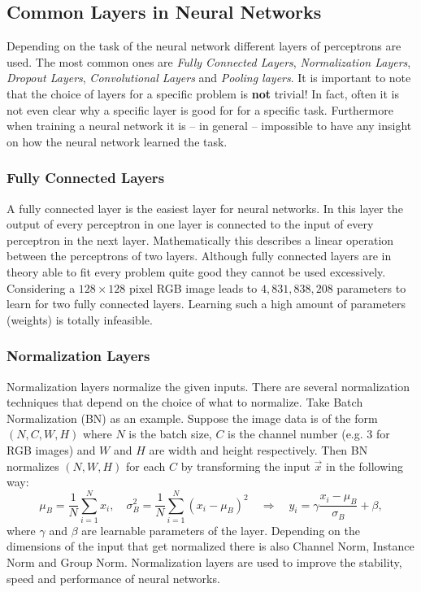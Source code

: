 \subsection{Common Layers in Neural Networks} \label{sec:2.1.3}
Depending on the task of the neural network different layers of perceptrons are used. The most common ones are \textit{Fully Connected Layers}, \textit{Normalization Layers}, \textit{Dropout Layers}, \textit{Convolutional Layers} and \textit{Pooling layers}. It is important to note that the choice of layers for a specific problem is \textbf{not} trivial! In fact, often it is not even clear why a specific layer is good for for a specific task. Furthermore when training a neural network it is – in general – impossible to have any insight on how the neural network learned the task.
%
\subsubsection{Fully Connected Layers}
A fully connected layer is the easiest layer for neural networks. In this layer the output of every perceptron in one layer is connected to the input of every perceptron in the next layer. Mathematically this describes a linear operation between the perceptrons of two layers. Although fully connected layers are in theory able to fit every problem quite good they cannot be used excessively. Considering a $128\times128$ pixel RGB image leads to $4,831,838,208$ parameters to learn for two fully connected layers. Learning such a high amount of parameters (weights) is totally infeasible.
%
\subsubsection{Normalization Layers}
Normalization layers normalize the given inputs. There are several normalization techniques that depend on the choice of what to normalize. Take Batch Normalization (BN) as an example. Suppose the image data is of the form $(N, C, W, H)$ where $N$ is the batch size, $C$ is the channel number (e.g. $3$ for RGB images) and $W$ and $H$ are width and height respectively. Then BN normalizes $(N, W, H)$ for each $C$ by transforming the input $\vec{x}$ in the following way:
%
\begin{equation} \label{equ:2.3}
    \mu_B=\frac{1}{N}\sum_{i=1}^Nx_i, \quad\sigma_B^2=\frac{1}{N}\sum_{i=1}^N(x_i-\mu_B)^2\quad \Longrightarrow\quad y_i=\gamma\frac{x_i-\mu_B}{\sigma_B}+\beta,
\end{equation}
%
where $\gamma$ and $\beta$ are learnable parameters of the layer. Depending on the dimensions of the input that get normalized there is also Channel Norm, Instance Norm and Group Norm. Normalization layers are used to improve the stability, speed and performance of neural networks.
%
